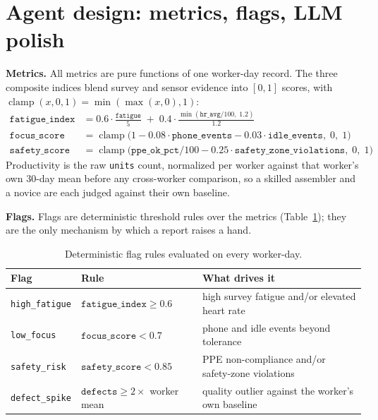 \documentclass[11pt,a4paper]{article}
\begin{document}
\section{Agent design: metrics, flags, LLM polish}
\textbf{Metrics.} All metrics are pure functions of one worker-day record.
The three composite indices blend survey and sensor evidence into $[0,1]$
scores, with $\operatorname{clamp}(x,0,1)=\min(\max(x,0),1)$:
\begin{align}
\texttt{fatigue\_index} &=
  0.6\cdot\frac{\texttt{fatigue}}{5} \;+\;
  0.4\cdot\frac{\min(\texttt{hr\_avg}/100,\;1.2)}{1.2}
  \label{eq:fatigue}\\[2pt]
\texttt{focus\_score} &=
  \operatorname{clamp}\bigl(1 - 0.08\cdot\texttt{phone\_events}
  - 0.03\cdot\texttt{idle\_events},\;0,\;1\bigr)
  \label{eq:focus}\\[2pt]
\texttt{safety\_score} &=
  \operatorname{clamp}\bigl(\texttt{ppe\_ok\_pct}/100
  - 0.25\cdot\texttt{safety\_zone\_violations},\;0,\;1\bigr)
  \label{eq:safety}
\end{align}
Productivity is the raw \texttt{units} count, normalized per worker against
that worker's own 30-day mean before any cross-worker comparison, so a
skilled assembler and a novice are each judged against their own baseline.

\textbf{Flags.} Flags are deterministic threshold rules over the metrics
(Table~\ref{tab:flags}); they are the only mechanism by which a report
raises a hand.

\begin{table}[htbp]
\centering\small
\caption{Deterministic flag rules evaluated on every worker-day.}
\label{tab:flags}
\begin{tabular}{@{}llp{6.9cm}@{}}
\toprule
Flag & Rule & What drives it \\
\midrule
\texttt{high\_fatigue} & $\texttt{fatigue\_index} \ge 0.6$ &
  high survey fatigue and/or elevated heart rate\\
\texttt{low\_focus} & $\texttt{focus\_score} < 0.7$ &
  phone and idle events beyond tolerance\\
\texttt{safety\_risk} & $\texttt{safety\_score} < 0.85$ &
  PPE non-compliance and/or safety-zone violations\\
\texttt{defect\_spike} & $\texttt{defects} \ge 2\times$ worker mean &
  quality outlier against the worker's own baseline\\
\bottomrule
\end{tabular}
\end{table}
\end{document}
